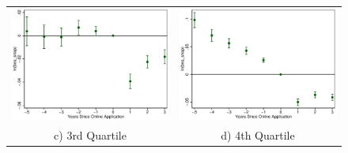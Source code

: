 \documentclass[11pt,letterpaper]{article}
\begin{document}
\begin{figure}
\begin{tabular}{cc}
\includegraphics[scale=0.57]{tabfig/evstu_size3_bea_snap_one_yrcfcttr_5_3}&\includegraphics[scale=0.57]{tabfig/evstu_size4_bea_snap_one_yrcfcttr_5_3}\\
c) 3rd Quartile & d) 4th Quartile\\
\end{tabular}
\end{figure}
\end{document}
